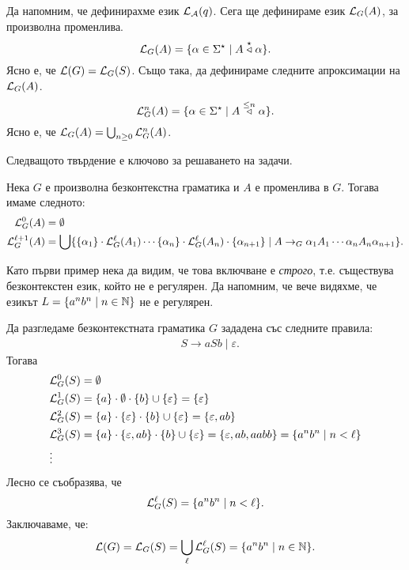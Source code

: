 Да напомним, че дефинирахме език $\mathcal{L}_{\mathcal{A}}(q)$.
Сега ще дефинираме език $\mathcal{L}_G(A)$, за произволна променлива.
\[\mathcal{L}_G(A) = \{\alpha \in \Sigma^\star \mid A \stackrel{{\star}}{\triangleleft}\alpha\}.\]
Ясно е, че $\mathcal{L}(G) = \mathcal{L}_G(S)$.
Също така, да дефинираме следните апроксимации на $\mathcal{L}_G(A)$.
\[\mathcal{L}^n_G(A) = \{\alpha \in \Sigma^\star \mid A \stackrel{{\leq n}}{\triangleleft} \alpha\}.\]
Ясно е, че $\mathcal{L}_G(A) = \bigcup_{n\geq 0}\mathcal{L}^n_G(A)$.

Следващото твърдение е ключово за решаването на задачи.

\begin{proposition}\label{pr:grammar:yield-approximation}
  Нека $G$ е произволна безконтекстна граматика и $A$ е променлива в $G$.
  Тогава имаме следното:
  \begin{align*}
    \mathcal{L}^0_G(A) & = \emptyset\\
    \mathcal{L}^{\ell+1}_G(A) & = \bigcup\{\{\alpha_1\}\cdot \mathcal{L}^\ell_G(A_1) \cdots \{\alpha_n\} \cdot \mathcal{L}^\ell_G(A_n) \cdot \{\alpha_{n+1}\} \mid A \to_G \alpha_1A_1\cdots\alpha_nA_n\alpha_{n+1}\}.
  \end{align*}
\end{proposition}



Като първи пример нека да видим, че това включване е {\em строго}, т.е. съществува безконтекстен език, който не е регулярен.
Да напомним, че вече видяхме, че езикът $L = \{a^nb^n \mid n\in\mathbb{N}\}$ не е регулярен.


\begin{example}
  Да разгледаме безконтекстната граматика $G$ зададена със следните правила:
  \begin{align*}
    & S \to aSb \mid \varepsilon.
  \end{align*}
  Тогава
  \begin{align*}
    & \mathcal{L}^0_G(S) = \emptyset\\
    & \mathcal{L}^1_G(S) = \{a\} \cdot \emptyset \cdot \{b\} \cup \{\varepsilon\} = \{\varepsilon\}\\
    & \mathcal{L}^{2}_G(S) = \{a\} \cdot \{\varepsilon\} \cdot \{b\} \cup \{\varepsilon\} = \{\varepsilon, ab\}\\
    & \mathcal{L}^{3}_G(S) = \{a\} \cdot \{\varepsilon, ab\} \cdot \{b\} \cup \{\varepsilon\} = \{\varepsilon,ab,aabb\} = \{a^nb^n \mid n < \ell\}\\
    & \vdots
  \end{align*}
  Лесно се съобразява, че
  \[\mathcal{L}^\ell_G(S) = \{a^nb^n \mid n < \ell\}.\]
  Заключаваме, че:
  \[\mathcal{L}(G) = \mathcal{L}_G(S) = \bigcup_{\ell}\mathcal{L}^\ell_G(S) = \{a^nb^n \mid n\in\mathbb{N}\}.\]
\end{example}

